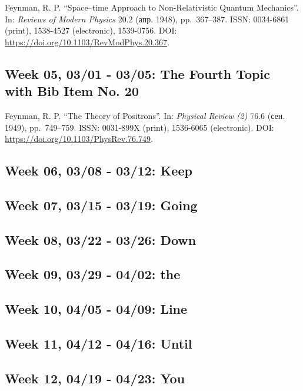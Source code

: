 \documentclass[]{article}
\begin{document}
Feynman, R. P. ``Space--time Approach to Non-Relativistic Quantum
Mechanics''. In: \emph{Reviews of Modern Physics} 20.2 (апр. 1948),
pp.~367--387. ISSN: 0034-6861 (print), 1538-4527 (electronic),
1539-0756. DOI: \url{https://doi.org/10.1103/RevModPhys.20.367}.

\subsection{Week 05, 03/01 - 03/05: The Fourth Topic with Bib Item No.
20}\label{week-05-0301---0305-the-fourth-topic-with-bib-item-no.-20}

Feynman, R. P. ``The Theory of Positrons''. In:
\emph{Physical Review (2)} 76.6 (сен. 1949), pp.~749--759. ISSN:
0031-899X (print), 1536-6065 (electronic). DOI:
\url{https://doi.org/10.1103/PhysRev.76.749}.

\subsection{Week 06, 03/08 - 03/12:
Keep}\label{week-06-0308---0312-keep}

\subsection{Week 07, 03/15 - 03/19:
Going}\label{week-07-0315---0319-going}

\subsection{Week 08, 03/22 - 03/26:
Down}\label{week-08-0322---0326-down}

\subsection{Week 09, 03/29 - 04/02: the}\label{week-09-0329---0402-the}

\subsection{Week 10, 04/05 - 04/09:
Line}\label{week-10-0405---0409-line}

\subsection{Week 11, 04/12 - 04/16:
Until}\label{week-11-0412---0416-until}

\subsection{Week 12, 04/19 - 04/23: You}\label{week-12-0419---0423-you}
\end{document}
